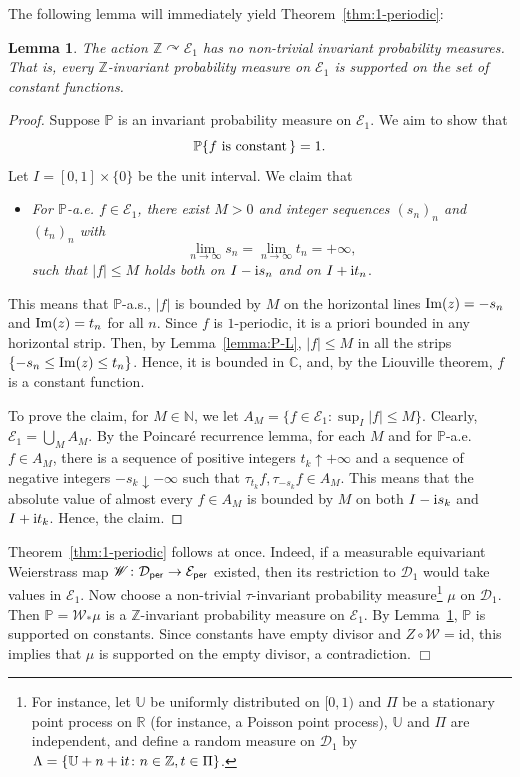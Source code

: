 \documentclass[11pt]{paper}
\newtheorem{lemma}{Lemma}
\newcommand{\bR}{\mathbb R}
\newcommand{\bC}{\mathbb C}
\newcommand{\bZ}{\mathbb Z}
\newcommand{\bN}{\mathbb N}
\newcommand{\bP}{\mathbb P}
\newcommand{\cE}{\mathcal E}
\newcommand{\cD}{\mathcal D}
\newcommand{\sW}{\mathscr W}
\begin{document}
\medskip
The following lemma will immediately yield Theorem~\ref{thm:1-periodic}:
\begin{lemma}\label{lemma:inv_meas}
The action $\bZ\curvearrowright \cE_1$ has no non-trivial invariant probability measures.
That is, every $\bZ$-invariant probability measure on $\cE_1$ is supported on the set of
constant functions.
\end{lemma}
\begin{proof}
Suppose $\bP$ is an invariant probability measure on $\cE_1$. We aim to show that
\[ \bP \{ f\ {\rm is\ constant\,} \} =1.\]
Let $I=[0, 1]\times \{0\}$ be the unit interval.
We claim that
\begin{itemize}
\item
{\em For $\bP$-a.e. $f\in\cE_1$, there exist $M>0$ and integer sequences $(s_n)_n$ and $(t_n)_n$
with
\[
\lim_{n\to\infty} s_n = \lim_{n\to\infty} t_n = +\infty,
\]
such that $|f|\le M$ holds both on $I-{\rm i}s_n$ and on $I+{\rm i}t_n$}.
\end{itemize}
This means that $\bP$-a.s.,  $|f|$ is bounded by $M$ on the horizontal lines ${\rm Im}(z)=-s_n$ and
${\rm Im}(z)=t_n$ for all $n$. Since $f$ is $1$-periodic, it is a priori bounded in any horizontal strip.
Then, by Lemma~\ref{lemma:P-L}, $|f|\le M$ in all the strips $\{-s_n \le {\rm Im}(z) \le t_n\}$.
Hence, it is bounded in $\bC$, and, by the Liouville theorem, $f$ is a constant function.

To prove the claim, for $M\in\bN$, we let $A_M = \{f \in \cE_{1}\colon  \sup_{I}|f| \le M\}$.
Clearly, $\cE_{1} = \bigcup_M A_M$. By the Poincar\'e recurrence lemma, for each $M$ and for
$\bP$-a.e. $f\in A_M$, there is a sequence of positive integers $t_k\uparrow +\infty$
and a sequence of negative integers $-s_k\downarrow -\infty$ such that $\tau_{t_{k}}f,
\tau_{-s_{k}}f \in A_M$.  This means that the absolute value of almost
every $f \in A_M$  is bounded by $M$ on both $I-{\rm i}s_{k}$ and $I+{\rm i}t_{k}$.
Hence, the claim.
\end{proof}




Theorem~\ref{thm:1-periodic} follows at once. Indeed, if a measurable equivariant Weierstrass map
$\sW\colon \cD_{\sf per}\to \cE_{\sf per}$ existed, then its restriction to $\cD_1$ would take
values in $\cE_1$. Now choose a non-trivial $\tau$-invariant probability measure\footnote{
For instance, let $\mathbb U$ be uniformly distributed on $[0, 1)$ and $\Pi$ be a stationary
point process on $\bR$ (for instance, a Poisson point process), $\mathbb U$ and $\Pi$ are independent,
and define a random measure on $\cD_1$ by
$ \Lambda = \{\mathbb U +n + {\rm i}t\colon n\in\bZ, t\in\Pi \}$.
} $\mu$ on $\cD_1$.
Then $\bP=\sW_*\mu$ is a $\bZ$-invariant probability measure on $\cE_1$.
By
Lemma~\ref{lemma:inv_meas}, $\bP$ is supported on constants. Since constants have
empty divisor and $Z\circ \sW=\mathrm{id}$, this implies that $\mu$ is supported on
the empty divisor, a contradiction.  \hfill $\Box$
\end{document}
